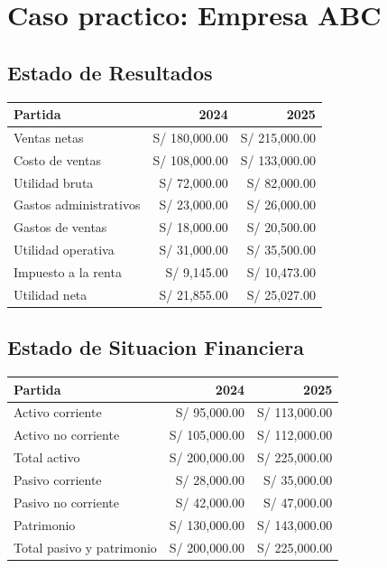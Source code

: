 \section{Caso practico: Empresa ABC}

\subsection{Estado de Resultados}

\begin{center}
\begin{tabular}{lrr}
\toprule
Partida & 2024 & 2025 \\
\midrule
Ventas netas & S/ 180,000.00 & S/ 215,000.00 \\
Costo de ventas & S/ 108,000.00 & S/ 133,000.00 \\
Utilidad bruta & S/ 72,000.00 & S/ 82,000.00 \\
Gastos administrativos & S/ 23,000.00 & S/ 26,000.00 \\
Gastos de ventas & S/ 18,000.00 & S/ 20,500.00 \\
Utilidad operativa & S/ 31,000.00 & S/ 35,500.00 \\
Impuesto a la renta & S/ 9,145.00 & S/ 10,473.00 \\
Utilidad neta & S/ 21,855.00 & S/ 25,027.00 \\
\bottomrule
\end{tabular}
\end{center}

\subsection{Estado de Situacion Financiera}

\begin{center}
\begin{tabular}{lrr}
\toprule
Partida & 2024 & 2025 \\
\midrule
Activo corriente & S/ 95,000.00 & S/ 113,000.00 \\
Activo no corriente & S/ 105,000.00 & S/ 112,000.00 \\
Total activo & S/ 200,000.00 & S/ 225,000.00 \\
Pasivo corriente & S/ 28,000.00 & S/ 35,000.00 \\
Pasivo no corriente & S/ 42,000.00 & S/ 47,000.00 \\
Patrimonio & S/ 130,000.00 & S/ 143,000.00 \\
Total pasivo y patrimonio & S/ 200,000.00 & S/ 225,000.00 \\
\bottomrule
\end{tabular}
\end{center}
